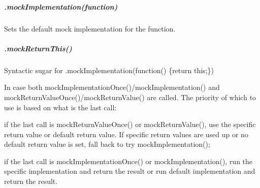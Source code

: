 \subparagraph*{{\ttfamily .mock\+Implementation(function)}}

Sets the default mock implementation for the function.

\subparagraph*{{\ttfamily .mock\+Return\+This()}}

Syntactic sugar for .mock\+Implementation(function() \{return this;\})

In case both {\ttfamily mock\+Implementation\+Once()/mock\+Implementation()} and {\ttfamily mock\+Return\+Value\+Once()/mock\+Return\+Value()} are called. The priority of which to use is based on what is the last call\+:
\begin{DoxyItemize}
\item if the last call is mock\+Return\+Value\+Once() or mock\+Return\+Value(), use the specific return value or default return value. If specific return values are used up or no default return value is set, fall back to try mock\+Implementation();
\item if the last call is mock\+Implementation\+Once() or mock\+Implementation(), run the specific implementation and return the result or run default implementation and return the result. 
\end{DoxyItemize}